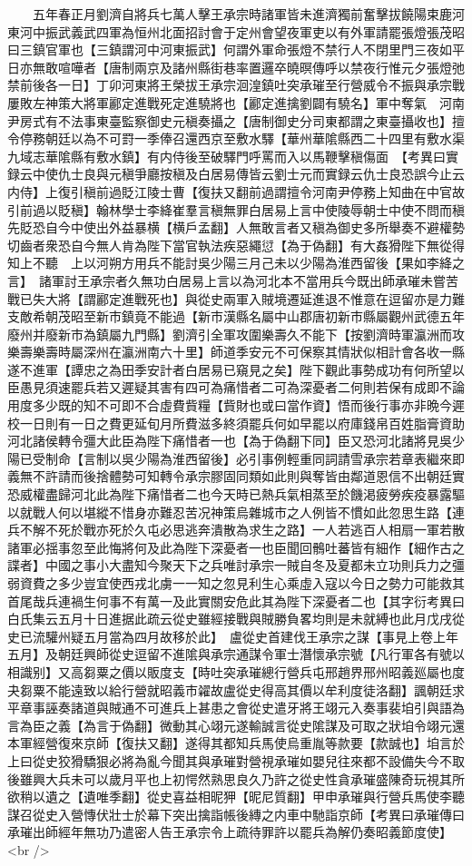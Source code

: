 　　五年春正月劉濟自將兵七萬人擊王承宗時諸軍皆未進濟獨前奮擊拔饒陽束鹿河東河中振武義武四軍為恒州北面招討會于定州會望夜軍吏以有外軍請罷張燈張茂昭曰三鎮官軍也【三鎮謂河中河東振武】何謂外軍命張燈不禁行人不閉里門三夜如平日亦無敢喧嘩者【唐制兩京及諸州縣街巷率置邏卒曉暝傳呼以禁夜行惟元夕張燈弛禁前後各一日】丁卯河東將王榮拔王承宗洄湟鎮吐突承璀至行營威令不振與承宗戰屢敗左神策大將軍酈定進戰死定進驍將也【酈定進擒劉闢有驍名】軍中奪氣　河南尹房式有不法事東臺監察御史元稹奏攝之【唐制御史分司東都謂之東臺攝收也】擅令停務朝廷以為不可罸一季俸召還西京至敷水驛【華州華隂縣西二十四里有敷水渠九域志華隂縣有敷水鎮】有内侍後至破驛門呼罵而入以馬鞭擊稹傷面　【考異曰實録云中使仇士良與元稹爭廳按稹及白居易傳皆云劉士元而實録云仇士良恐誤今止云内侍】上復引稹前過貶江陵士曹【復扶又翻前過謂擅令河南尹停務上知曲在中官故引前過以貶稹】翰林學士李絳崔羣言稹無罪白居易上言中使陵辱朝士中使不問而稹先貶恐自今中使出外益暴横【横戶孟翻】人無敢言者又稹為御史多所舉奏不避權勢切齒者衆恐自今無人肯為陛下當官執法疾惡繩愆【為于偽翻】有大姦猾陛下無從得知上不聽　上以河朔方用兵不能討吳少陽三月己未以少陽為淮西留後【果如李絳之言】　諸軍討王承宗者久無功白居易上言以為河北本不當用兵今既出師承璀未嘗苦戰已失大將【謂酈定進戰死也】與從史兩軍入賊境遷延進退不惟意在逗留亦是力難支敵希朝茂昭至新市鎮竟不能過【新市漢縣名屬中山郡唐初新市縣屬觀州武德五年廢州并廢新市為鎮屬九門縣】劉濟引全軍攻圍樂壽久不能下【按劉濟時軍瀛洲而攻樂壽樂壽時屬深州在瀛洲南六十里】師道季安元不可保察其情狀似相計會各收一縣遂不進軍【譚忠之為田季安計者白居易已窺見之矣】陛下觀此事勢成功有何所望以臣愚見須速罷兵若又遲疑其害有四可為痛惜者二可為深憂者二何則若保有成即不論用度多少既的知不可即不合虛費貲糧【貲財也或曰當作資】悟而後行事亦非晩今遲校一日則有一日之費更延旬月所費滋多終須罷兵何如早罷以府庫錢帛百姓脂膏資助河北諸侯轉令彊大此臣為陛下痛惜者一也【為于偽翻下同】臣又恐河北諸將見吳少陽已受制命【言制以吳少陽為淮西留後】必引事例輕重同詞請雪承宗若章表繼來即義無不許請而後捨體勢可知轉令承宗膠固同類如此則與奪皆由鄰道恩信不出朝廷實恐威權盡歸河北此為陛下痛惜者二也今天時已熱兵氣相蒸至於饑渇疲勞疾疫暴露驅以就戰人何以堪縱不惜身亦難忍苦况神策烏雜城市之人例皆不慣如此忽思生路【連兵不解不死於戰亦死於久屯必思逃奔潰散為求生之路】一人若逃百人相扇一軍若散諸軍必揺事忽至此悔將何及此為陛下深憂者一也臣聞回鶻吐蕃皆有細作【細作古之諜者】中國之事小大盡知今聚天下之兵唯討承宗一賊自冬及夏都未立功則兵力之彊弱資費之多少豈宜使西戎北虜一一知之忽見利生心乘虛入寇以今日之勢力可能救其首尾哉兵連禍生何事不有萬一及此實關安危此其為陛下深憂者二也【其字衍考異曰白氏集云五月十日進据此疏云從史雖經接戰與賊勝負畧均則是未就縛也此月戊戌從史已流驩州疑五月當為四月故移於此】　盧從史首建伐王承宗之謀【事見上卷上年五月】及朝廷興師從史逗留不進隂與承宗通謀令軍士潛懷承宗號【凡行軍各有號以相識别】又高芻粟之價以販度支【時吐突承璀總行營兵屯邢趙界邢州昭義廵屬也度夬芻粟不能遠致以給行營就昭義市糴故盧從史得高其價以牟利度徒洛翻】諷朝廷求平章事誣奏諸道與賊通不可進兵上甚患之會從史遣牙將王翊元入奏事裴垍引與語為言為臣之義【為言于偽翻】微動其心翊元遂輸誠言從史隂謀及可取之狀垍令翊元還本軍經營復來京師【復扶又翻】遂得其都知兵馬使烏重胤等款要【款誠也】垍言於上曰從史狡猾驕狠必將為亂今聞其與承璀對營視承璀如嬰兒往來都不設備失今不取後雖興大兵未可以歲月平也上初愕然熟思良久乃許之從史性貪承璀盛陳奇玩視其所欲稍以遺之【遺唯季翻】從史喜益相昵狎【昵尼質翻】甲申承璀與行營兵馬使李聽謀召從史入營慱伏壯士於幕下突出擒詣帳後縳之内車中馳詣京師【考異曰承璀傳曰承璀出師經年無功乃遣密人告王承宗令上疏待罪許以罷兵為解仍奏昭義節度使】<br />
